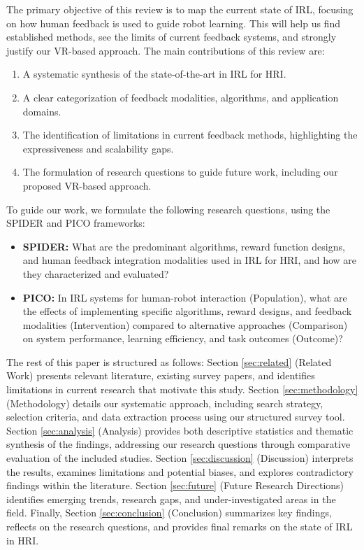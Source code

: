 \documentclass[rnd]{mas_proposal}
\begin{document}
The primary objective of this review is to map the current state of IRL, focusing on how human feedback is used to guide robot learning. This will help us find established methods, see the limits of current feedback systems, and strongly justify our VR-based approach. The main contributions of this review are:
\begin{enumerate}
    \item A systematic synthesis of the state-of-the-art in IRL for HRI.
    \item A clear categorization of feedback modalities, algorithms, and application domains.
    \item The identification of limitations in current feedback methods, highlighting the expressiveness and scalability gaps.
    \item The formulation of research questions to guide future work, including our proposed VR-based approach.
\end{enumerate}

To guide our work, we formulate the following research questions, using the SPIDER and PICO frameworks:

\begin{itemize}
    \item \textbf{SPIDER:} What are the predominant algorithms, reward function designs, and human feedback integration modalities used in IRL for HRI, and how are they characterized and evaluated?
    \item \textbf{PICO:} In IRL systems for human-robot interaction (Population), what are the effects of implementing specific algorithms, reward designs, and feedback modalities (Intervention) compared to alternative approaches (Comparison) on system performance, learning efficiency, and task outcomes (Outcome)?
    
\end{itemize}

The rest of this paper is structured as follows: Section \ref{sec:related} (Related Work) presents relevant literature, existing survey papers, and identifies limitations in current research that motivate this study. Section \ref{sec:methodology} (Methodology) details our systematic approach, including search strategy, selection criteria, and data extraction process using our structured survey tool. Section \ref{sec:analysis} (Analysis) provides both descriptive statistics and thematic synthesis of the findings, addressing our research questions through comparative evaluation of the included studies. Section \ref{sec:discussion} (Discussion) interprets the results, examines limitations and potential biases, and explores contradictory findings within the literature. Section \ref{sec:future} (Future Research Directions) identifies emerging trends, research gaps, and under-investigated areas in the field. Finally, Section \ref{sec:conclusion} (Conclusion) summarizes key findings, reflects on the research questions, and provides final remarks on the state of IRL in HRI.
\end{document}
